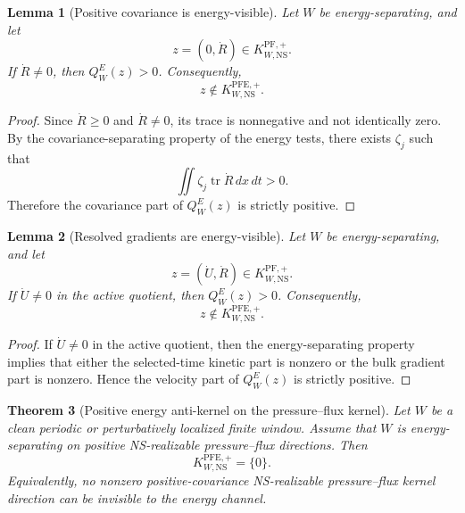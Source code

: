 \documentclass[11pt]{article}
\numberwithin{equation}{section}
\theoremstyle{plain}
\newtheorem{theorem}{Theorem}[section]
\newtheorem{lemma}[theorem]{Lemma}
\theoremstyle{definition}
\theoremstyle{remark}
\newcommand{\NS}{\mathrm{NS}}
\newcommand{\PF}{\mathrm{PF}}
\newcommand{\PFE}{\mathrm{PFE}}
\newcommand{\tr}{\operatorname{tr}}
\begin{document}
\begin{lemma}[Positive covariance is energy-visible]
\label{lem:positive-covariance-energy-visible}
Let \(W\) be energy-separating, and let
\[
        z=(0,\dot R)\in K^{\PF,+}_{W,\NS}.
\]
If \(\dot R\neq0\), then \(Q^E_W(z)>0\).  Consequently,
\[
        z\notin K^{\PFE,+}_{W,\NS}.
\]
\end{lemma}

\begin{proof}
Since \(\dot R\ge0\) and \(\dot R\neq0\), its trace is nonnegative and not identically zero.  By the covariance-separating property of the energy tests, there exists \(\zeta_j\) such that
\[
        \iint\zeta_j\tr\dot R\,dx\,dt>0.
\]
Therefore the covariance part of \(Q^E_W(z)\) is strictly positive.
\end{proof}

\begin{lemma}[Resolved gradients are energy-visible]
\label{lem:resolved-gradient-energy-visible}
Let \(W\) be energy-separating, and let
\[
        z=(\dot U,\dot R)\in K^{\PF,+}_{W,\NS}.
\]
If \(\dot U\neq0\) in the active quotient, then \(Q^E_W(z)>0\).  Consequently,
\[
        z\notin K^{\PFE,+}_{W,\NS}.
\]
\end{lemma}

\begin{proof}
If \(\dot U\neq0\) in the active quotient, then the energy-separating property implies that either the selected-time kinetic part is nonzero or the bulk gradient part is nonzero.  Hence the velocity part of \(Q^E_W(z)\) is strictly positive.
\end{proof}

\begin{theorem}[Positive energy anti-kernel on the pressure--flux kernel]
\label{thm:positive-energy-anti-kernel-pf}
Let \(W\) be a clean periodic or perturbatively localized finite window.  Assume that \(W\) is energy-separating on positive NS-realizable pressure--flux directions.  Then
\begin{equation}
        K^{\PFE,+}_{W,\NS}=\{0\}.
        \label{eq:positive-energy-anti-kernel}
\end{equation}
Equivalently, no nonzero positive-covariance NS-realizable pressure--flux kernel direction can be invisible to the energy channel.
\end{theorem}
\end{document}

